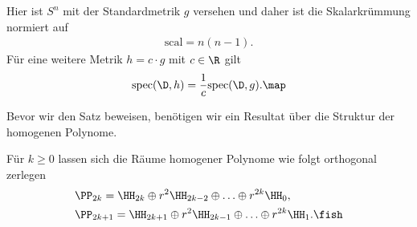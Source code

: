 \documentclass[%
	paper=a5,%
	fleqn,%
	DIV=18,%
	BCOR=0mm,
	fontsize=11pt,
	titlepage=false,%
	bibliography=totoc,
	DIV=18,%
	twoside=true,
	pdftitle=Riemannsche Geometrie,
	pdfauthor=Uwe Semmelmann,
	numbers=noendperiod]%
	{scrbook}
\begin{document}
\newcommand{\scal}{\mathrm{scal}}
\newcommand{\spec}{\mathrm{spec}}

\begin{rem}
Hier ist $S^n$ mit der Standardmetrik $g$ versehen und daher ist die Skalarkrümmung normiert auf
\begin{align*}
\scal = n(n-1).
\end{align*}
Für eine weitere Metrik $h=c\cdot g$ mit $c\in\R$ gilt
\begin{align*}
\spec(\D,h) = \frac{1}{c}\spec(\D,g).\map
\end{align*}
\end{rem}

Bevor wir den Satz beweisen, benötigen wir ein Resultat über die Struktur der homogenen Polynome.

\begin{lem}
Für $k\ge 0$ lassen sich die Räume homogener Polynome wie folgt orthogonal zerlegen
\begin{align*}
&\PP_{2k} = \HH_{2k}\oplus r^2 \HH_{2k-2} \oplus \ldots \oplus r^{2k} \HH_{0},\\
&\PP_{2k+1} = \HH_{2k+1}\oplus r^2 \HH_{2k-1} \oplus \ldots \oplus r^{2k}\HH_{1}.\fish
\end{align*}
\end{lem}
\end{document}
